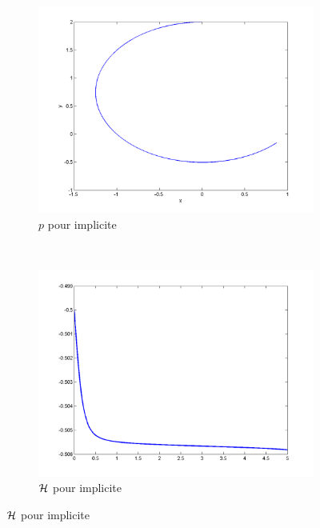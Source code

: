 \begin{figure}
\begin{subfigure}[b]{0.3\textwidth}
    \includegraphics[width=\textwidth]{images/Q1_implicite_p.png}
    \caption{$p$ pour implicite}
    \label{fig:q1_implicite_p}
  \end{subfigure}
  ~
  \begin{subfigure}[b]{0.3\textwidth}
    \includegraphics[width=\textwidth]{images/Q1_implicite_H.png}
    \caption{$\mathcal{H}$ pour implicite}
    \label{fig:q1_implicite_H}
  \end{subfigure}


\end{figure}
